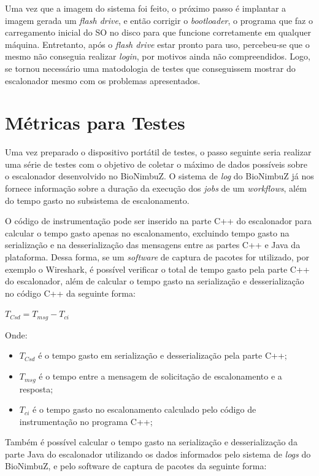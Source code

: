 Uma vez que a imagem do sistema foi feito, o próximo passo é implantar a imagem gerada um \textit{flash drive}, e então corrigir o \textit{bootloader}, o programa que faz o carregamento inicial do \acrshort{SO} no disco para que funcione corretamente em qualquer máquina. Entretanto, após o \textit{flash drive} estar pronto para uso, percebeu-se que o mesmo não conseguia realizar \textit{login}, por motivos ainda não compreendidos. Logo, se tornou necessário uma matodologia de testes que conseguissem mostrar do escalonador mesmo com os problemas apresentados.

\section{Métricas para Testes}

Uma vez preparado o dispositivo portátil de testes, o passo seguinte seria realizar uma série de testes com o objetivo de coletar o máximo de dados possíveis sobre o escalonador desenvolvido no BioNimbuZ. O sistema de \textit{log} do BioNimbuZ já nos fornece informação sobre a duração da execução dos \textit{jobs} de um \textit{workflows}, além do tempo gasto no subsistema de escalonamento. 

O código de instrumentação pode ser inserido na parte C++ do escalonador para calcular o tempo gasto apenas no escalonamento, excluindo tempo gasto na serialização e na desserialização das mensagens entre as partes C++ e Java da plataforma. Dessa forma, se um \textit{software} de captura de pacotes for utilizado, por exemplo o Wireshark\cite{Wireshark}, é possível verificar o total de tempo gasto pela parte C++ do escalonador, além de calcular o tempo gasto na serialização e desserialização no código C++ da seguinte forma:

\centerline{ $T_{Csd} = T_{msg} - T_{ci}$ }

Onde: 
 \begin{itemize}
 	\item $T_{Csd}$ é o tempo gasto em serialização e desserialização pela parte C++;
 	\item $T_{msg}$ é o tempo entre a mensagem de solicitação de escalonamento e a resposta;
 	\item $T_{ci}$ é o tempo gasto no escalonamento calculado pelo código de instrumentação no programa C++;
 \end{itemize}

Também é possível calcular o tempo gasto na serialização e desserialização da parte Java do escalonador utilizando os dados informados pelo sistema de \textit{logs} do BioNimbuZ, e pelo software de captura de pacotes da seguinte forma:


